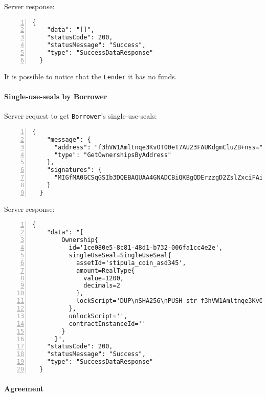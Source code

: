 Server response:
\begin{Verbatim}[numbers=left,xleftmargin=1cm,firstnumber=1,breaklines=true,breakanywhere=true,tabsize=2]
  {
    "data": "[]",
    "statusCode": 200,
    "statusMessage": "Success",
    "type": "SuccessDataResponse"
  }
\end{Verbatim}

It is possible to notice that the \verb|Lender| it has no funds.

\paragraph{Single-use-seals by Borrower}

Server request to get \verb|Borrower|'s single-use-seals:
\begin{Verbatim}[numbers=left,xleftmargin=1cm,firstnumber=1,breaklines=true,breakanywhere=true,tabsize=2]
  {
    "message": {
      "address": "f3hVW1Amltnqe3KvOT00eT7AU23FAUKdgmCluZB+nss=",
      "type": "GetOwnershipsByAddress"
    },
    "signatures": {
      "MIGfMA0GCSqGSIb3DQEBAQUAA4GNADCBiQKBgQDErzzgD2ZslZxciFAiX3/ot7lrkZDw4148jFZrsDZPE6CVs9xXFSHGgy/mFvIFLXhnChO6Nyd2be3lbgeavLMCMVUiTStXr117Km17keWpb3sItkKKsLFBOcIIU8XXowI/OhzQN2XPZYESHgjdQ5vwEj2YyueiS7WKP94YWz/pswIDAQAB": "hSNodnUyusffNlv+KNq4605pFvqh91pVspFhTgbmWccE/LKM6h4bedpvTgMHoVDezvA7v2XTzmLG5eL3lOeA6I2xJMH32DcV60IPSoh61oVHnwPQcQHY039D4y5VSJ0GMQJKIcTEq3fqIdabg7261xUaegHUnXrcyynh9GpMJxk="
    }
  }
\end{Verbatim}

Server response:
\begin{Verbatim}[numbers=left,xleftmargin=1cm,firstnumber=1,breaklines=true,breakanywhere=true,tabsize=2]
  {
    "data": "[
        Ownership{
          id='1ce080e5-8c81-48d1-b732-006fa1cc4e2e', 
          singleUseSeal=SingleUseSeal{
            assetId='stipula_coin_asd345', 
            amount=RealType{
              value=1200, 
              decimals=2
            }, 
            lockScript='DUP\nSHA256\nPUSH str f3hVW1Amltnqe3KvOT00eT7AU23FAUKdgmCluZB+nss=\nEQUAL\nCHECKSIG\nHALT\n'
          }, 
          unlockScript='', 
          contractInstanceId=''
        }
      ]",
    "statusCode": 200,
    "statusMessage": "Success",
    "type": "SuccessDataResponse"
  }
\end{Verbatim}

\paragraph{Agreement}

